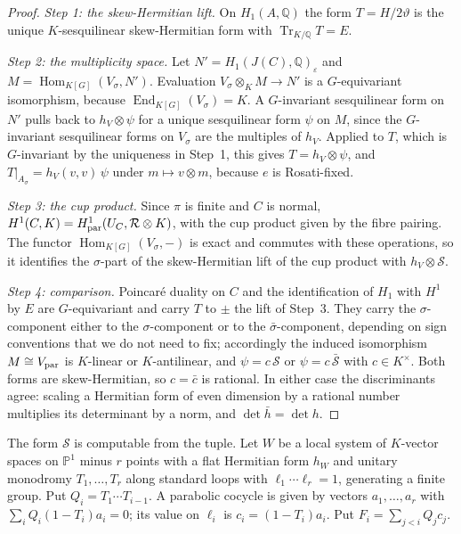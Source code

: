 \documentclass[11pt]{amsart}
\theoremstyle{definition}
\theoremstyle{remark}
\newcommand{\Q}{\mathbb Q}
\newcommand{\PP}{\mathbb P}
\newcommand{\End}{\operatorname{End}}
\newcommand{\Hom}{\operatorname{Hom}}
\newcommand{\Tr}{\operatorname{Tr}}
\newcommand{\Vp}{V_{\rm par}}
\begin{document}
\begin{proof}
\emph{Step 1: the skew-Hermitian lift.} On $H_1(A,\Q)$ the form $T=H/2\vartheta$ is the unique $K$-sesquilinear skew-Hermitian form with $\Tr_{K/\Q}T=E$.

\emph{Step 2: the multiplicity space.} Let $N'=H_1(J(C),\Q)_\varepsilon$ and $M=\Hom_{K[G]}(V_\sigma,N')$. Evaluation $V_\sigma\otimes_KM\to N'$ is a $G$-equivariant isomorphism, because $\End_{K[G]}(V_\sigma)=K$. A $G$-invariant sesquilinear form on $N'$ pulls back to $h_V\otimes\psi$ for a unique sesquilinear form $\psi$ on $M$, since the $G$-invariant sesquilinear forms on $V_\sigma$ are the multiples of $h_V$. Applied to $T$, which is $G$-invariant by the uniqueness in Step~1, this gives $T=h_V\otimes\psi$, and $T|_{A_\sigma}=h_V(v,v)\,\psi$ under $m\mapsto v\otimes m$, because $e$ is Rosati-fixed.

\emph{Step 3: the cup product.} Since $\pi$ is finite and $C$ is normal, $H^1(C,K)=H^1_{\rm par}(U_C,\mathcal R\otimes K)$, with the cup product given by the fibre pairing. The functor $\Hom_{K[G]}(V_\sigma,-)$ is exact and commutes with these operations, so it identifies the $\sigma$-part of the skew-Hermitian lift of the cup product with $h_V\otimes\mathcal S$.

\emph{Step 4: comparison.} Poincar\'e duality on $C$ and the identification of $H_1$ with $H^1$ by $E$ are $G$-equivariant and carry $T$ to $\pm$ the lift of Step~3. They carry the $\sigma$-component either to the $\sigma$-component or to the $\bar\sigma$-component, depending on sign conventions that we do not need to fix; accordingly the induced isomorphism $M\cong\Vp$ is $K$-linear or $K$-antilinear, and $\psi=c\,\mathcal S$ or $\psi=c\,\bar{\mathcal S}$ with $c\in K^\times$. Both forms are skew-Hermitian, so $c=\bar c$ is rational. In either case the discriminants agree: scaling a Hermitian form of even dimension by a rational number multiplies its determinant by a norm, and $\det\bar h=\det h$.
\end{proof}

The form $\mathcal S$ is computable from the tuple. Let $W$ be a local system of $K$-vector spaces on $\PP^1$ minus $r$ points with a flat Hermitian form $h_W$ and unitary monodromy $T_1,\dots,T_r$ along standard loops with $\ell_1\cdots\ell_r=1$, generating a finite group. Put $Q_i=T_1\cdots T_{i-1}$. A parabolic cocycle is given by vectors $a_1,\dots,a_r$ with $\sum_iQ_i(1-T_i)a_i=0$; its value on $\ell_i$ is $c_i=(1-T_i)a_i$. Put $F_i=\sum_{j<i}Q_jc_j$.
\end{document}
